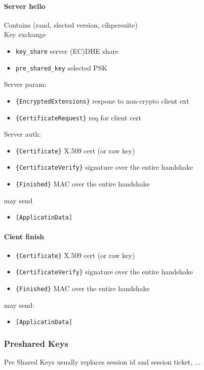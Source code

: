 \documentclass[12pt]{article}
\begin{document}
\paragraph{Server hello}
Contains (rand, slected version, cihpersuite) \\
Key exchange
\begin{itemize}
  \item \verb|key_share| server (EC)DHE share
  \item \verb|pre_shared_key| selected PSK
\end{itemize}
Server param:
\begin{itemize}
  \item \verb|{EncryptedExtensions}| respone to non-crypto client ext
  \item \verb|{CertificateRequest}| req for client cert
\end{itemize}
Server auth:
\begin{itemize}
  \item \verb|{Certificate}| X.509 cert (or raw key)
  \item \verb|{CertificateVerify}| signature over the entire handshake
  \item \verb|{Finished}| MAC over the entire handshake
\end{itemize}
may send
\begin{itemize}
  \item \verb|[ApplicatinData]|
\end{itemize}

\paragraph{Cient finish}
\begin{itemize}
  \item \verb|{Certificate}| X.509 cert (or raw key)
  \item \verb|{CertificateVerify}| signature over the entire handshake
  \item \verb|{Finished}| MAC over the entire handshake
\end{itemize}
may send:
\begin{itemize}
 \item \verb|[ApplicatinData]|
\end{itemize}


\subsubsection{Preshared Keys}
Pre Shared Keys usually replaces session id and session ticket,
... 
\end{document}
